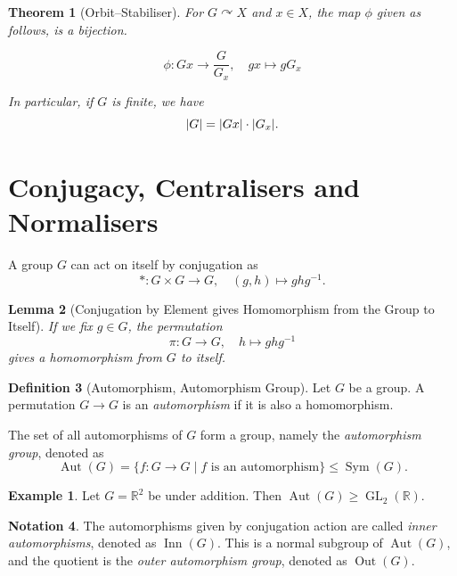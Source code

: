 \documentclass{article}
\newtheorem{theorem}{Theorem}[section]
\newtheorem{lemma}[theorem]{Lemma}
\theoremstyle{definition}
\newtheorem{definition}[theorem]{Definition}
\newtheorem*{example*}{Example}
\newtheorem{notation}[theorem]{Notation}
\theoremstyle{remark}
\DeclarePairedDelimiter{\abs}{\lvert}{\rvert}
\newcommand{\pqty}[1]{\left(#1\right)}
\newcommand{\set}[2]{\{#1\mid #2\}}
\newcommand{\flatfrac}[2]{\frac{#1}{#2}}
\newcommand{\functiondomain}[3]{#1:#2\to #3}
\newcommand{\function}[5]{#1:#2\to #3,\quad #4\mapsto #5}
\newcommand{\inverse}{^{-1}}
\newcommand{\subgroup}{\leq}
\newcommand{\supgroup}{\geq}
\newcommand{\actson}{\curvearrowright}
\newcommand{\RR}{\mathbb{R}}
\newcommand{\Aut}{\operatorname{Aut}}
\newcommand{\GL}{\operatorname{GL}}
\newcommand{\Inn}{\operatorname{Inn}}
\newcommand{\Out}{\operatorname{Out}}
\newcommand{\Sym}{\operatorname{Sym}}
\begin{document}
\begin{theorem}[Orbit--Stabiliser]
    \label{thm:orbit-stabiliser}%
    For \(G \actson X\) and \(x \in X\), the map \(\phi\) given as follows, is a bijection.

    \[
        \function{\phi}{Gx}{\flatfrac{G}{G_x}}{gx}{g G_x}
    \]
    
    In particular, if \(G\) is finite, we have
    \[
        \abs{G} = \abs{Gx} \cdot \abs{G_x}.
    \]
\end{theorem}

\section{Conjugacy, Centralisers and Normalisers}

A group \(G\) can act on itself by conjugation as
\[
    \function{\ast}{G \times G}{G}{\pqty{g, h}}{g h g\inverse}.
\]

\begin{lemma}[Conjugation by Element gives Homomorphism from the Group to Itself]
    \label{lem:conjugation-element-homomorphism-self}%
    If we fix \(g \in G\), the permutation
    \[
        \function{\pi}{G}{G}{h}{ghg\inverse}
    \]
    gives a homomorphism from \(G\) to itself.
\end{lemma}

\begin{definition}[Automorphism, Automorphism Group]
    \label{def:automorphism}%
    Let \(G\) be a group. A permutation \(G \to G\) is an \emph{automorphism} if it is also a homomorphism.

    The set of all automorphisms of \(G\) form a group, namely the \emph{automorphism group}, denoted as
    \[
        \Aut\pqty{G} = \set{\functiondomain{f}{G}{G}}{f \text{ is an automorphism}} \subgroup \Sym\pqty{G}.
    \]
\end{definition}

\begin{example*}
    Let \(G = \RR^2\) be under addition. Then \(\Aut\pqty{G} \supgroup \GL_2\pqty{\RR}\).
\end{example*}

\begin{notation}
    The automorphisms given by conjugation action are called \emph{inner automorphisms}, denoted as \(\Inn\pqty{G}\). This is a normal subgroup of \(\Aut\pqty{G}\), and the quotient is the \emph{outer automorphism group}, denoted as \(\Out\pqty{G}\).
\end{notation}
\end{document}
